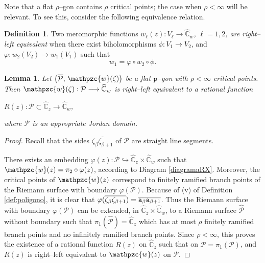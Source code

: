 \documentclass[final,3p,times]{elsarticle}
\newcommand{\CW}{\ensuremath{{\widehat{\mathbb C}}}}
\newtheorem{lemma}[theorem]{Lemma}
\theoremstyle{definition}
\newtheorem{definition}[theorem]{Definition}
\begin{document}
Note that a flat $\rho$--gon contains $\rho$ critical points; 
the case when $\rho < \infty$ will be relevant. 
To see this, consider the following equivalence relation.

\begin{definition}
\label{def:holo-right-left-equiv}
Two meromorphic functions  
\emph{$w_\ell(z): V_\ell \longrightarrow\CW_w$, 
$\ell=1,2$,
are right--left equivalent} 
when there exist biholomorphisms 
$\phi:V_1 \longrightarrow V_2$, and
$\varphi: w_2(V_2) \longrightarrow w_1 (V_1)$ such that
\begin{equation}
\label{eq:right-equiv}
 w_1 = \varphi \circ w_2 \circ \phi .
\end{equation}
\end{definition}

\begin{lemma}
\label{lem:polygon-rational-block}
Let $\big(\overline{\mathcal{P}}, \, \mathpzc{w} (\zeta) \big)$ 
be a flat $\tt p$--gon
with $\rho<\infty$ critical points. 
Then $\mathpzc{w}(\zeta):
\mathcal{P}\longrightarrow\CW_w$ is 
right--left equivalent to
a rational function 

\centerline{$
R(z): 
\mathscr{P} \subset \CW_z \longrightarrow\CW_w$,}

\noindent 
where $\mathscr{P}$ is 
an appropriate Jordan domain.
\end{lemma}

\begin{proof}
Recall that the sides $\overline{\zeta_\beta \zeta_{\beta+1}}$ of $\mathcal{P}$ 
are straight line segments.

There exists an embedding $\varphi(z):\mathcal{P}\hookrightarrow \CW_z \times \CW_w$
such that $\mathpzc{w}(z) = \pi_2\circ\varphi(z)$, according to
Diagram \eqref{diagramaRX}.
Moreover, the critical points of $\mathpzc{w}(z)$ correspond to finitely ramified branch points
of the Riemann surface with boundary $\varphi(\mathcal{P})$.
Because of (v) of Definition \ref{def:poligono}, it is clear that $\varphi( \overline{\zeta_\beta \zeta_{\beta+1}} ) = \overline{{\tt a}_\beta {\tt a}_{\beta+1}}$.
Thus the Riemann surface with boundary $\varphi(\mathcal{P})$ can be extended, 
in $\CW_z\times\CW_w$, to a Riemann surface $\widehat{\mathcal{P}}$ 
without boundary such that $\pi_1(\widehat{\mathcal{P}})= \CW_z$
which has at most $\rho$
finitely ramified branch points
and no infinitely ramified branch points.
Since $\rho<\infty$, 
this proves the existence of a rational function $R(z)$ on $\CW_z$ such that 
on $\mathscr{P}= \pi_1(\mathcal{P})$,
and $R(z)$ is right--left equivalent to $\mathpzc{w}(z)$ 
on $\mathcal{P}$.
\end{proof}
\end{document}
